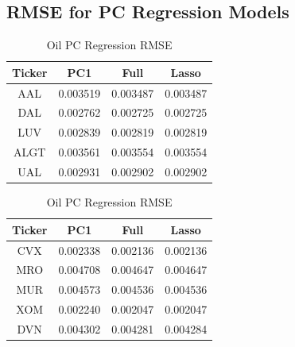 \documentclass{article}
\begin{document}
\subsection{RMSE for PC Regression Models}
\begin{table}[!htb]
    \begin{minipage}{.5\linewidth}
      \caption{Airline PC Regression RMSE}
      \centering
      \begin{tabular}{ c|c|c|c }
        \textbf{Ticker} & \textbf{PC1} & \textbf{Full} & \textbf{Lasso} \\
        \hline
        AAL	& 0.003519 & 0.003487 & 0.003487\\
        DAL	& 0.002762 & 0.002725 & 0.002725\\
        LUV	& 0.002839 & 0.002819 & 0.002819\\
        ALGT & 0.003561 & 0.003554 & 0.003554\\
        UAL	& 0.002931 & 0.002902 & 0.002902\\
        \end{tabular}
    \end{minipage}%
    \begin{minipage}{.5\linewidth}
      \centering
        \caption{Oil PC Regression RMSE}
        \begin{tabular}{ c|c|c|c  }
            \textbf{Ticker} & \textbf{PC1} & \textbf{Full} & \textbf{Lasso} \\
            \hline
            CVX	& 0.002338	& 0.002136	& 0.002136\\
            MRO	& 0.004708	& 0.004647	& 0.004647\\
            MUR	& 0.004573	& 0.004536	& 0.004536\\
            XOM	& 0.002240	& 0.002047	& 0.002047\\
            DVN	& 0.004302	& 0.004281	& 0.004284\\
        \end{tabular}
    \end{minipage} 
\end{table}
\end{document}
